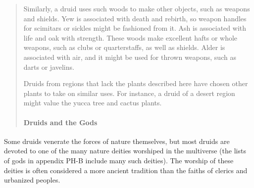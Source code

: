 \documentclass[
]{article}
\begin{document}
\begin{quote}
Similarly, a druid uses such woods to make other objects, such as
weapons and shields. Yew is associated with death and rebirth, so weapon
handles for scimitars or sickles might be fashioned from it. Ash is
associated with life and oak with strength. These woods make excellent
hafts or whole weapons, such as clubs or quarterstaffs, as well as
shields. Alder is associated with air, and it might be used for thrown
weapons, such as darts or javelins.

Druids from regions that lack the plants described here have chosen
other plants to take on similar uses. For instance, a druid of a desert
region might value the yucca tree and cactus plants.

\mbox{}%
\hypertarget{druids-and-the-gods}{%
\paragraph{Druids and the Gods}\label{druids-and-the-gods}}
\end{quote}

Some druids venerate the forces of nature themselves, but most druids
are devoted to one of the many nature deities worshiped in the
multiverse (the lists of gods in appendix PH-B include many such
deities). The worship of these deities is often considered a more
ancient tradition than the faiths of clerics and urbanized peoples.
\end{document}
